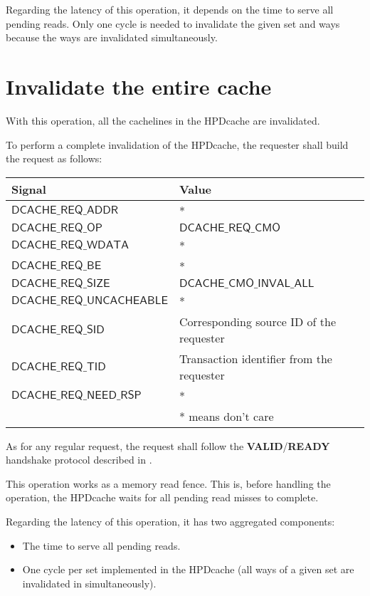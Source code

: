 \documentclass[10pt,titlepage,twoside]{book}
\begin{document}
Regarding the latency of this operation, it depends on the time to serve all pending reads.
Only one cycle is needed to invalidate the given set and ways because the ways are invalidated simultaneously.


\newpage
\section{Invalidate the entire cache}

With this operation, all the cachelines in the \ac{HPDcache} are invalidated.

To perform a complete invalidation of the \ac{HPDcache}, the requester shall build the request as follows:

{\centering\footnotesize\begin{tabular}{p{.38\linewidth}p{.55\linewidth}}
  \toprule
  \textbf{Signal}
  & \textbf{Value} \\
  \midrule
  $\mathsf{DCACHE\_REQ\_ADDR}$
  & *\\
  \midrule
  $\mathsf{DCACHE\_REQ\_OP}$
  & $\mathsf{DCACHE\_REQ\_CMO}$ \\
  \midrule
  $\mathsf{DCACHE\_REQ\_WDATA}$
  & *\\
  \midrule
  $\mathsf{DCACHE\_REQ\_BE}$
  & *\\
  \midrule
  $\mathsf{DCACHE\_REQ\_SIZE}$
  & $\mathsf{DCACHE\_CMO\_INVAL\_ALL}$\\
  \midrule
  $\mathsf{DCACHE\_REQ\_UNCACHEABLE}$
  & *\\
  \midrule
  $\mathsf{DCACHE\_REQ\_SID}$
  & Corresponding source ID of the requester\\
  \midrule
  $\mathsf{DCACHE\_REQ\_TID}$
  & Transaction identifier from the requester\\
  \midrule
  $\mathsf{DCACHE\_REQ\_NEED\_RSP}$
  & *\\
  \bottomrule
  & * means don't care \\
\end{tabular}}

As for any regular request, the request shall follow the \textbf{VALID}/\textbf{READY} handshake protocol described in .

This operation works as a memory read fence.
This is, before handling the operation, the \ac{HPDcache} waits for all pending read misses to complete.

Regarding the latency of this operation, it has two aggregated components:

\begin{itemize}
\item The time to serve all pending reads.
\item One cycle per set implemented in the \ac{HPDcache} (all ways of a given set are invalidated in simultaneously).
\end{itemize}
\end{document}
